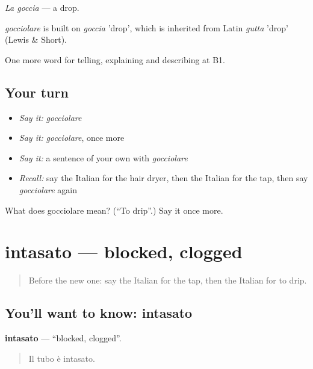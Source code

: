\emph{La goccia} — a drop.

\begin{cousinweb}
\emph{gocciolare} is built on \emph{goccia} 'drop', which is inherited from Latin \emph{gutta} 'drop' (Lewis \& Short).
\end{cousinweb}

\begin{grammarlens}[title={What you've built}]
One more word for telling, explaining and describing at B1.
\end{grammarlens}

\subsection*{Your turn}
\begin{itemize}
\raggedright
  \item \emph{Say it:} \emph{gocciolare}
  \item \emph{Say it:} \emph{gocciolare}, once more
  \item \emph{Say it:} a sentence of your own with \emph{gocciolare}
  \item \emph{Recall:} say the Italian for the hair dryer, then the Italian for the tap, then say \emph{gocciolare} again
\end{itemize}

\begin{tcolorbox}[breakable,colback=teal!4,colframe=teal!35!black,title={Before you move on}]
What does gocciolare mean? (\textquotedblleft{}To drip\textquotedblright{}.) Say it once more.
\end{tcolorbox}
\section[intasato]{intasato — blocked, clogged}

\label{lesson:IT-C434-intasato}



\begin{quote}
Before the new one: say the Italian for the tap, then the Italian for to drip.
\end{quote}

\subsection*{You'll want to know: intasato}
\textbf{intasato} — \textquotedblleft{}blocked, clogged\textquotedblright{}.

\begin{quote}
Il tubo è intasato.
\end{quote}

